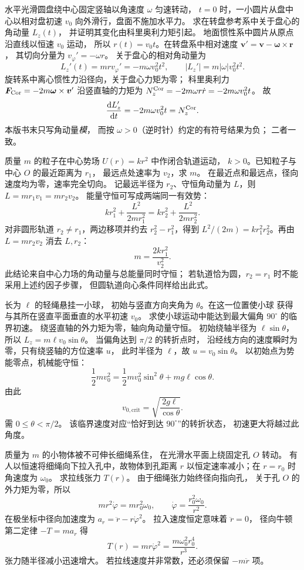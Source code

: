 水平光滑圆盘绕中心固定竖轴以角速度 $\omega$ 匀速转动，
$t=0$ 时，一小圆片从盘中心以相对盘初速
$v_0$ 向外滑行，盘面不施加水平力。
求在转盘参考系中关于盘心的角动量 $L_z(t)$，
并证明其变化由科里奥利力矩引起。
\exsolution
地面惯性系中圆片从原点沿直线以恒速 $v_0$ 运动，
所以 $r(t)=v_0t$。在转盘系中相对速度
$\bm v'=\bm v-\bm\omega\times\bm r$，
其切向分量为 $v_\varphi'=-\omega r$。
关于盘心的相对角动量为
\[
\boxed{L_z'(t)=mr v_\varphi'
=-m\omega v_0^2t^2},
\qquad |L_z'|=m|\omega|v_0^2t^2.
\]
旋转系中离心惯性力沿径向，关于盘心力矩为零；
科里奥利力 $\bm F_{\rm Cor}=-2m\bm\omega\times\bm v'$
沿竖直轴的力矩为
$N_z^{\rm Cor}=-2m\omega r\dot r
=-2m\omega v_0^2t$。
故
\[
\frac{\mathrm dL_z'}{\mathrm dt}
=-2m\omega v_0^2t=N_z^{\rm Cor}.
\]
\excheck 本版书末只写角动量\emph{模}，
而按 $\omega>0$（逆时针）约定的有符号结果为负；
二者一致。

质量 $m$ 的粒子在中心势场 $U(r)=kr^2$ 中作闭合轨道运动，
$k>0$。已知粒子与中心 $O$ 的最近距离为 $r_1$，
最远点处速率为 $v_2$，求 $m$。
\exsolution
在最近点和最远点，径向速度均为零，速率完全切向。
记最远半径为 $r_2$、守恒角动量为 $L$，则
$L=mr_1v_1=mr_2v_2$。
能量守恒可写成两端同一有效势：
\[
kr_1^2+\frac{L^2}{2mr_1^2}
=kr_2^2+\frac{L^2}{2mr_2^2}.
\]
对非圆形轨道 $r_2\ne r_1$，两边移项并约去
$r_2^2-r_1^2$，得到
$L^2/(2m)=kr_1^2r_2^2$。再由
$L=mr_2v_2$ 消去 $L,r_2$：
\[
\boxed{m=\frac{2kr_1^2}{v_2^2}}.
\]
\excheck 此结论来自中心力场的角动量与总能量同时守恒；
若轨道恰为圆，$r_2=r_1$ 时不能采用上述约因子步骤，
但圆轨道向心条件同样给出此式。

长为 $\ell$ 的轻绳悬挂一小球，
初始与竖直方向夹角为 $\theta$。在这一位置使小球
获得与其所在竖直平面垂直的水平初速 $v_0$。
求使小球运动中能达到最大偏角 $90^\circ$ 的临界初速。
\exsolution
绕竖直轴的外力矩为零，轴向角动量守恒。
初始绕轴半径为 $\ell\sin\theta$，所以
$L_z=m\ell v_0\sin\theta$。
当偏角达到 $\pi/2$ 的转折点时，
沿经线方向的速度瞬时为零，只有绕竖轴的方位速率 $u$，
此时半径为 $\ell$，故
$u=v_0\sin\theta$。
以初始点为势能零点，机械能守恒：
\[
\frac12mv_0^2
=\frac12m v_0^2\sin^2\theta+mg\ell\cos\theta.
\]
由此
\[
\boxed{v_{0,\mathrm{crit}}=
\sqrt{\frac{2g\ell}{\cos\theta}}}.
\]
\excheck 需 $0\le\theta<\pi/2$。
该临界速度对应“恰好到达 $90^\circ$”的转折状态，
初速更大将越过此角度。

质量为 $m$ 的小物体被不可伸长细绳系住，
在光滑水平面上绕固定孔 $O$ 转动。
有人以恒速将细绳向下拉入孔中，故物体到孔距离
$r$ 以恒定速率减小；在 $r=r_0$ 时角速度为 $\omega_0$。
求拉线张力 $T(r)$。
\exsolution
由于细绳张力始终径向指向孔，
关于孔 $O$ 的外力矩为零，所以
\[
mr^2\dot\varphi=mr_0^2\omega_0,\qquad
\dot\varphi=\frac{r_0^2\omega_0}{r^2}.
\]
在极坐标中径向加速度为
$a_r=\ddot r-r\dot\varphi^2$。
拉入速度恒定意味着 $\ddot r=0$，
径向牛顿第二定律 $-T=ma_r$ 得
\[
\boxed{T(r)=mr\dot\varphi^2
=\frac{m\omega_0^2r_0^4}{r^3}}.
\]
\excheck 张力随半径减小迅速增大。
若拉线速度并非常数，还必须保留 $-m\ddot r$ 项。

